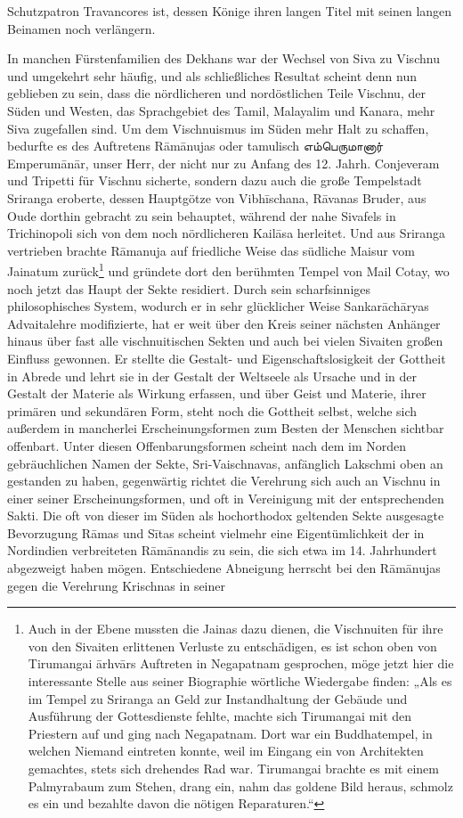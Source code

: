 \documentclass{article}
\newcommand{\TamilText}[1]{\texttamil{#1}}
\newcommand{\tam}[1]{\TamilText{#1}}
\begin{document}
Schutzpatron Travancores ist, dessen Könige ihren langen Titel mit seinen langen Beinamen noch verlängern.

In manchen Fürstenfamilien des Dekhans war der Wechsel von Siva zu Vischnu und umgekehrt sehr häufig, und als schließliches Resultat scheint denn nun geblieben zu sein, dass die nördlicheren und nordöstlichen Teile Vischnu, der Süden und Westen, das Sprachgebiet des Tamil, Malayalim und Kanara, mehr Siva zugefallen sind. Um dem Vischnuismus im Süden mehr Halt zu schaffen, bedurfte es des Auftretens R\={a}m\={a}nujas oder tamulisch \tam{எம்பெருமானார்} Emperum\={a}n\={a}r, unser Herr, der nicht nur zu Anfang des 12. Jahrh. Conjeveram und Tripetti für Vischnu sicherte, sondern dazu auch die große Tempelstadt Sriranga eroberte, dessen Hauptgötze von Vibh\={i}schana, R\={a}vanas Bruder, aus Oude dorthin gebracht zu sein behauptet, während der nahe Sivafels in Trichinopoli sich von dem noch nördlicheren Kail\={a}sa herleitet. Und aus Sriranga vertrieben brachte R\={a}manuja auf friedliche Weise das südliche Maisur vom Jainatum zurück\footnote{Auch in der Ebene mussten die Jainas dazu dienen, die Vischnuiten für ihre von den Sivaiten erlittenen Verluste zu entschädigen, es ist schon oben von Tirumangai \={a}rhv\={a}rs Auftreten in Negapatnam gesprochen, möge jetzt hier die interessante Stelle aus seiner Biographie wörtliche Wiedergabe finden: „Als es im Tempel zu Sriranga an Geld zur Instandhaltung der Gebäude und Ausführung der Gottesdienste fehlte, machte sich Tirumangai mit den Priestern auf und ging nach Negapatnam. Dort war ein Buddhatempel, in welchen Niemand eintreten konnte, weil im Eingang ein von Architekten gemachtes, stets sich drehendes Rad war. Tirumangai brachte es mit einem Palmyrabaum zum Stehen, drang ein, nahm das goldene Bild heraus, schmolz es ein und bezahlte davon die nötigen Reparaturen.“} und gründete dort den berühmten Tempel von Mail Cotay, wo noch jetzt das Haupt der Sekte residiert. Durch sein scharfsinniges philosophisches System, wodurch er in sehr glücklicher Weise Sankar\={a}ch\={a}ryas Advaitalehre modifizierte, hat er weit über den Kreis seiner nächsten Anhänger hinaus über fast alle vischnuitischen Sekten und auch bei vielen Sivaiten großen Einfluss gewonnen. Er stellte die Gestalt- und Eigenschaftslosigkeit der Gottheit in Abrede und lehrt sie in der Gestalt der Weltseele als Ursache und in der Gestalt der Materie als Wirkung erfassen, und über Geist und Materie, ihrer primären und sekundären Form, steht noch die Gottheit selbst, welche sich außerdem in mancherlei Erscheinungsformen zum Besten der Menschen sichtbar offenbart. Unter diesen Offenbarungsformen scheint nach dem im Norden gebräuchlichen Namen der Sekte, Sri-Vaischnavas, anfänglich Lakschmi oben an gestanden zu haben, gegenwärtig richtet die Verehrung sich auch an Vischnu in einer seiner Erscheinungsformen, und oft in Vereinigung mit der entsprechenden Sakti. Die oft von dieser im Süden als hochorthodox geltenden Sekte ausgesagte Bevorzugung R\={a}mas und S\={i}tas scheint vielmehr eine Eigentümlichkeit der in Nordindien verbreiteten R\={a}m\={a}nandis zu sein, die sich etwa im 14. Jahrhundert abgezweigt haben mögen. Entschiedene Abneigung herrscht bei den R\={a}m\={a}nujas gegen die Verehrung Krischnas in seiner 
\end{document}
